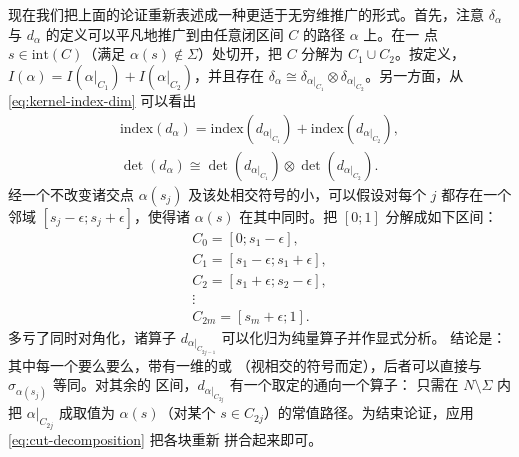 现在我们把上面的论证重新表述成一种更适于无穷维推广的形式。首先，注意 $\delta_{\alpha}$
与 $d_{\alpha}$ 的定义可以平凡地推广到由任意闭区间 $C$ \trParametrization{}的路径 $\alpha$ 上。在一
点 $s\in\mathrm{int}(C)$（满足 $\alpha(s)\notin\Sigma$）处切开，把 $C$ 分解为
$C_1\cup C_2$。按定义，$I(\alpha)=I(\alpha|_{C_1})+I(\alpha|_{C_2})$，并且存在%
\trCanonical{}\trIsomorphism{} $\delta_{\alpha}\cong\delta_{\alpha|_{C_1}}\otimes
\delta_{\alpha|_{C_2}}$。另一方面，从\eqref{eq:kernel-index-dim} 可以看出
\begin{equation}\label{eq:cut-decomposition}
\begin{gathered}
\mathrm{index}(d_{\alpha})=\mathrm{index}(d_{\alpha|_{C_1}})+
\mathrm{index}(d_{\alpha|_{C_2}}),\\
\det(d_{\alpha})\cong\det(d_{\alpha|_{C_1}})\otimes\det(d_{\alpha|_{C_2}}).
\end{gathered}
\end{equation}
经一个不改变诸交点 $\alpha(s_j)$ 及该处相交符号的小\trDeformation，可以假设对每个
$j$ 都存在一个邻域 $[s_j-\epsilon;s_j+\epsilon]$，使得诸 $\alpha(s)$ 在其中同时\trDiagonalizable{}。把 $[0;1]$ 分解成如下区间：
\begin{equation*}
\begin{gathered}
C_0=[0;s_1-\epsilon],\\
C_1=[s_1-\epsilon;s_1+\epsilon],\\
C_2=[s_1+\epsilon;s_2-\epsilon],\\
\vdots\\
C_{2m}=[s_m+\epsilon;1].
\end{gathered}
\end{equation*}
多亏了同时对角化，诸算子 $d_{\alpha|_{C_{2j-1}}}$ 可以化归为纯量算子并作显式分析。
结论是：其中每一个要么\trInjective{}要么\trSurjective，带有一维的\trKernel{}或%
\trCokernel（视相交的符号而定），后者可以直接与 $\sigma_{\alpha(s_j)}$ 等同。对其余的
区间，$d_{\alpha|_{C_{2j}}}$ 有一个取定的\trDeformation{}通向一个\trInvertible{}算子：
只需在 $N\setminus\Sigma$ 内把 $\alpha|_{C_{2j}}$ \trRetract{}成取值为 $\alpha(s)$（对某个
$s\in C_{2j}$）的常值路径。为结束论证，应用\eqref{eq:cut-decomposition} 把各块重新
拼合起来即可。
